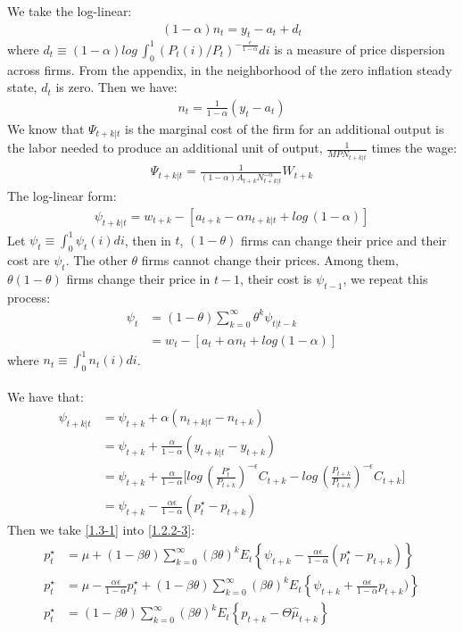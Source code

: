 \documentclass{article}
\numberwithin{equation}{section}
\begin{document}
We take the log-linear:
	\begin{align*}
		(1 - \alpha) n_t = y_t - a_t + d_t
	\end{align*}
where $d_t \equiv (1 - \alpha)log\,\int^1_0 (P_t(i) / P_t)^{-\frac{\epsilon}{1-\alpha}} di$ is a measure of price dispersion across firms. From the appendix, in the neighborhood of the zero inflation steady state, $d_t$ is zero. Then we have:
	\begin{align*}
		n_t = \frac{1}{1 - \alpha}(y_t - a_t)
	\end{align*}
We know that $\Psi_{t+k|t}$ is the marginal cost of the firm for an additional output is the labor needed to produce an additional unit of output, $\frac{1}{MPN_{t+k|t}}$ times the wage:
	\begin{align*}
		\Psi_{t+k|t} = \frac{1}{(1 - \alpha) A_{t+k} N^{-\alpha}_{t+k|t}} W_{t+k}
	\end{align*}
The log-linear form:
	\begin{align*}
		\psi_{t+k|t} = w_{t+k} - [a_{t+k} - \alpha n_{t+k|t} + log\,(1 - \alpha)]
	\end{align*}
Let $\psi_t \equiv \int^1_0 \psi_t(i) di$, then in $t$, $(1 - \theta)$ firms can change their price and their cost are $\psi_t$. The other $\theta$ firms cannot change their prices. Among them, $\theta(1 - \theta)$ firms change their price in $t - 1$, their cost is $\psi_{t-1}$, we repeat this process:
	\begin{align*}
		\psi_t &= (1 - \theta) \sum\limits^\infty_{k=0} \theta^k \psi_{t|t-k}\\
		&= w_t - [a_t + \alpha n_t + log(1 - \alpha)]
	\end{align*}
where $n_t \equiv \int^1_0 n_t(i) di$.\\\\
We have that:
	\begin{align}
		\psi_{t+k|t} &= \psi_{t+k} + \alpha(n_{t+k|t} - n_{t+k}) \nonumber\\
		&= \psi_{t+k} + \frac{\alpha}{1 - \alpha} (y_{t+k|t} - y_{t+k}) \nonumber\\
		&= \psi_{t+k} + \frac{\alpha}{1 - \alpha} \bigg[ log\,\left( \frac{P^\star_t}{P_{t+k}} \right)^{-\epsilon} C_{t+k} - log\,\left( \frac{P_{t+k}}{P_{t+k}} \right)^{-\epsilon} C_{t+k} \bigg] \nonumber\\
		&= \psi_{t+k} - \frac{\alpha\epsilon}{1 - \alpha} (p^\star_t - p_{t+k}) \label{1.3-1}
	\end{align}
Then we take \eqref{1.3-1} into \eqref{1.2.2-3}:
	\begin{align}
		p^\star_t &= \mu + (1 - \beta\theta) \sum\limits^\infty_{k=0} (\beta\theta)^k E_t \left\{ \psi_{t+k} - \frac{\alpha\epsilon}{1 - \alpha} (p^\star_t - p_{t+k}) \right\} \nonumber\\
		p^\star_t &= \mu - \frac{\alpha\epsilon}{1 - \alpha} p^\star_t + (1 - \beta\theta) \sum\limits^\infty_{k=0} (\beta\theta)^k E_t \left\{ \psi_{t+k} + \frac{\alpha\epsilon}{1 - \alpha} p_{t+k}) \right\} \nonumber\\
		p^\star_t &= (1 - \beta\theta) \sum\limits^\infty_{k=0} (\beta\theta)^k E_t \left\{ p_{t+k} - \Theta \hat{\mu}_{t+k} \right\} \label{1.3-2}
	\end{align}
\end{document}
